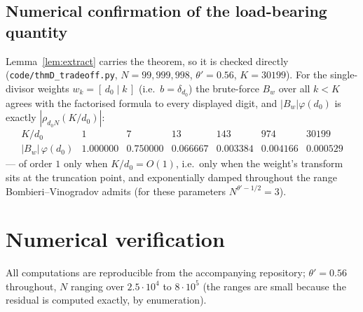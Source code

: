 \documentclass[11pt,a4paper]{article}
\theoremstyle{plain}
\theoremstyle{definition}
\begin{document}
\subsection{Numerical confirmation of the load-bearing quantity}

Lemma~\ref{lem:extract} carries the theorem, so it is checked directly
(\texttt{code/thmD\_tradeoff.py}, $N = 99{,}999{,}998$,
$\theta'=0.56$, $K=30199$). For the single-divisor weights
$w_k=[\,d_0\mid k\,]$ (i.e.\ $b=\delta_{d_0}$) the brute-force
$B_w$ over all $k<K$ agrees with the factorised formula to every
displayed digit, and $|B_w|\varphi(d_0)$ is exactly
$|\rho_{d_0N}(K/d_0)|$:
\[
\begin{array}{r|cccccc}
 K/d_0 & 1 & 7 & 13 & 143 & 974 & 30199\\\hline
 |B_w|\,\varphi(d_0) & 1.000000 & 0.750000 & 0.066667 & 0.003384
  & 0.004166 & 0.000529
\end{array}
\]
--- of order $1$ only when $K/d_0=O(1)$, i.e.\ only when the weight's
transform sits at the truncation point, and exponentially damped
throughout the range Bombieri--Vinogradov admits (for these parameters
$N^{\theta'-1/2}=3$).

\section{Numerical verification}

All computations are reproducible from the accompanying repository;
$\theta'=0.56$ throughout, $N$ ranging over $2.5\cdot10^4$ to
$8\cdot10^5$ (the ranges are small because the residual is computed
exactly, by enumeration).
\end{document}
